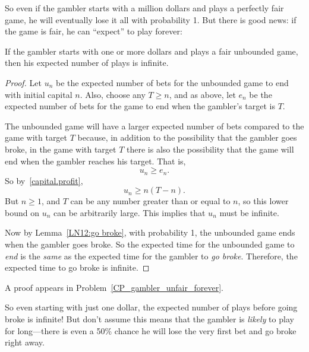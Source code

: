 So even if the gambler starts with a million dollars and plays a
perfectly fair game, he will eventually lose it all with probability
1.  But there is good news: if the game is fair, he can ``expect'' to
play forever:

\begin{lemma}\label{LN12:play forever}
If the gambler starts with one or more dollars and plays a fair
unbounded game, then his expected number of plays is infinite.
\end{lemma}

\begin{editingnotes}
\begin{proof}
Let $u_n$ be the expected number of bets for the unbounded game
to end with initial capital $n$.  Also, choose any $T \geq n$, and as
above, let $e_n$ be the expected number of bets for the game to end
when the gambler's target is $T$.


The unbounded game will have a larger expected number of bets compared
to the game with target $T$ because, in addition to the possibility
that the gambler goes broke, in the game with target $T$ there is also
the possibility that the game will end when the gambler reaches his
target.  That is,
\[
u_n \geq e_n.
\]
So by~\eqref{capital.profit},
\[
u_n \geq n(T-n).
\]
But $n \geq 1$, and $T$ can be any number greater than or equal to $n$, so
this lower bound on $u_n$ can be arbitrarily large.  This implies that
$u_n$ must be infinite.

Now by Lemma~\ref{LN12:go broke}, with probability 1, the unbounded game ends
when the gambler goes broke.  So the expected time for the unbounded game
to \emph{end} is the \emph{same} as the expected time for the gambler to
\emph{go broke}.  Therefore, the expected time to go broke is infinite.
\end{proof}
\end{editingnotes}

A proof appears in Problem~\ref{CP_gambler_unfair_forever}.

So even starting with just one dollar, the expected number of plays
before going broke is infinite!  But don't assume this means that the
gambler is \emph{likely} to play for long---there is even a 50\%
chance he will lose the very first bet and go broke right away.

\iffalse In fact, if the game is unfavorable, then
Theorem~\ref{LN12:ExQthm} and Corollary~\ref{LN12:biaswincor} imply
that his expected time to go broke is essentially proportional to his
initial capital, that is, $\Theta(n)$.  \fi

